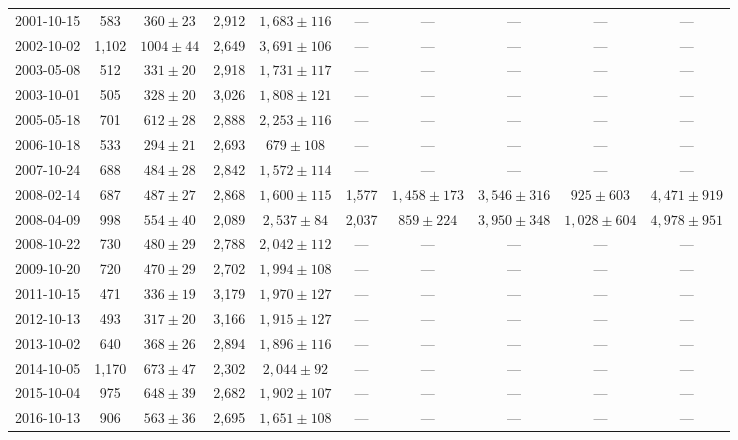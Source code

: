 \begin{landscape}
\begin{longtable}{cccccccccc}
{2001-10-15} & 583 & {$360  \pm  23$} & 2,912 & {$1,683 \pm 116$} & --- & --- & --- & --- & --- \\
{2002-10-02} & 1,102 & {$1004  \pm  44$} & 2,649 & {$3,691 \pm 106$} & --- & --- & --- & --- & --- \\
{2003-05-08} & 512 & {$331  \pm  20$} & 2,918 & {$1,731 \pm 117$} & --- & --- & --- & --- & --- \\
{2003-10-01} & 505 & {$328  \pm  20$} & 3,026 & {$1,808 \pm 121$} & --- & --- & --- & --- & --- \\
{2005-05-18} & 701 & {$612  \pm  28$} & 2,888 & {$2,253 \pm 116$} & --- & --- & --- & --- & --- \\
{2006-10-18} & 533 & {$294  \pm  21$} & 2,693 & {$679 \pm 108$} & --- & --- & --- & --- & --- \\
{2007-10-24} & 688 & {$484  \pm  28$} & 2,842 & {$1,572 \pm 114$} & --- & --- & --- & --- & --- \\
{2008-02-14} & 687 & {$487  \pm  27$} & 2,868 & {$1,600 \pm 115$} & 1,577 & {$1,458 \pm 173$} & {$3,546 \pm 316$} & {$925 \pm 603$} & {$4,471 \pm 919$} \\
{2008-04-09} & 998 & {$554  \pm  40$} & 2,089 & {$2,537 \pm 84$} & 2,037 & {$859 \pm 224$} & {$3,950 \pm 348$} & {$1,028 \pm 604$} & {$4,978 \pm 951$} \\
{2008-10-22} & 730 & {$480  \pm  29$} & 2,788 & {$2,042 \pm 112$} & --- & --- & --- & --- & --- \\
{2009-10-20} & 720 & {$470  \pm  29$} & 2,702 & {$1,994 \pm 108$} & --- & --- & --- & --- & --- \\
{2011-10-15} & 471 & {$336  \pm  19$} & 3,179 & {$1,970 \pm 127$} & --- & --- & --- & --- & --- \\
{2012-10-13} & 493 & {$317  \pm  20$} & 3,166 & {$1,915 \pm 127$} & --- & --- & --- & --- & --- \\
{2013-10-02} & 640 & {$368  \pm  26$} & 2,894 & {$1,896 \pm 116$} & --- & --- & --- & --- & --- \\
{2014-10-05} & 1,170 & {$673  \pm  47$} & 2,302 & {$2,044 \pm 92$} & --- & --- & --- & --- & --- \\
{2015-10-04} & 975 & {$648  \pm  39$} & 2,682 & {$1,902 \pm 107$} & --- & --- & --- & --- & --- \\
{2016-10-13} & 906 & {$563  \pm  36$} & 2,695 & {$1,651 \pm 108$} & --- & --- & --- & --- & --- \\
\end{longtable} 
\end{landscape} 
